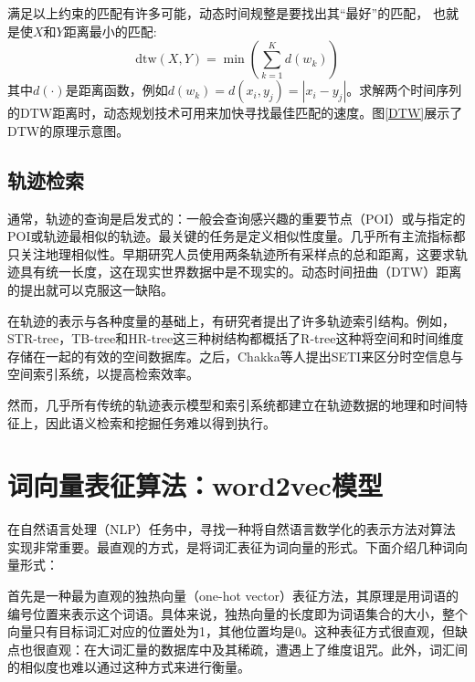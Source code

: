 
满足以上约束的匹配有许多可能，动态时间规整是要找出其“最好”的匹配， 也就是使$X$和$Y$距离最小的匹配:
\begin{equation}
\text{dtw}( X , Y ) = \min \left( \sum _ { k = 1 } ^ { K } d \left( w _ { k } \right) \right)
\end{equation}
其中$d(\cdot)$是距离函数，例如$d \left( w _ { k } \right) = d \left( x _ { i } , y _ { j } \right) = \left| x _ { i } - y _ { j } \right|$。求解两个时间序列的DTW距离时，动态规划技术可用来加快寻找最佳匹配的速度。图\ref{DTW}展示了DTW的原理示意图。


\subsection{轨迹检索}
通常，轨迹的查询是启发式的：一般会查询感兴趣的重要节点（POI）或与指定的POI或轨迹最相似的轨迹。最关键的任务是定义相似性度量。几乎所有主流指标都只关注地理相似性。早期研究人员使用两条轨迹所有采样点的总和距离，这要求轨迹具有统一长度，这在现实世界数据中是不现实的。动态时间扭曲（DTW）距离的提出就可以克服这一缺陷。

在轨迹的表示与各种度量的基础上，有研究者提出了许多轨迹索引结构。例如，STR-tree，TB-tree和HR-tree这三种树结构都概括了R-tree这种将空间和时间维度存储在一起的有效的空间数据库。之后，Chakka等人提出SETI来区分时空信息与空间索引系统，以提高检索效率。

然而，几乎所有传统的轨迹表示模型和索引系统都建立在轨迹数据的地理和时间特征上，因此语义检索和挖掘任务难以得到执行。


\section{词向量表征算法：word2vec模型}
在自然语言处理（NLP）任务中，寻找一种将自然语言数学化的表示方法对算法实现非常重要。最直观的方式，是将词汇表征为词向量的形式。下面介绍几种词向量形式：

首先是一种最为直观的独热向量（one-hot vector）表征方法，其原理是用词语的编号位置来表示这个词语。具体来说，独热向量的长度即为词语集合的大小，整个向量只有目标词汇对应的位置处为1，其他位置均是0。这种表征方式很直观，但缺点也很直观：在大词汇量的数据库中及其稀疏，遭遇上了维度诅咒。此外，词汇间的相似度也难以通过这种方式来进行衡量。

